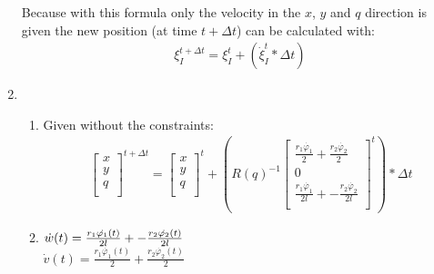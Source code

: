 \documentclass[a4paper, 20pt]{report}
\begin{document}
\begin{enumerate}
        Because with this formula only the velocity in the $x$, $y$ and $q$
        direction is given the new position (at time $t+\Delta t$) can be calculated with:
        \begin{align*}
            \xi^{t + \Delta t}_I = \xi^{t}_I + (\dot{\xi}^{t}_I *\Delta t )
        \end{align*}
    \item
    \begin{enumerate}{a} 
    \item Given without the constraints:
                \begin{align*}
                    \begin{bmatrix}
                        x\\
                        y\\
                        q\\
                    \end{bmatrix}^{t + \Delta t}
                    = 
                    \begin{bmatrix}
                        x\\
                        y\\
                        q\\
                    \end{bmatrix}^{t}
                    +( R(q)^{-1}  
                    \begin{bmatrix}
                        \frac{r_1\dot{\varphi_1}}{2} + \frac{r_2\dot{\varphi_2}}{2}\\
                        0\\
                        \frac{r_1\dot{\varphi_1}}{2l} + -\frac{r_2\dot{\varphi_2}}{2l}\\ 
                    \end{bmatrix}^{t}) * \Delta t
                \end{align*}
        \item
            $ \dot{w}(t) = \large{\frac{r_1\dot{\varphi_1}(t)}{2l} +
                -\frac{r_2\dot{\varphi_2}(t)}{2l}}$\\
                $ \dot{v}(t) = \frac{r_1\dot{\varphi_1}(t)}{2} +
                \frac{r_2\dot{\varphi_2}(t)}{2}$
        \end{enumerate}


\end{enumerate}
\end{document}
